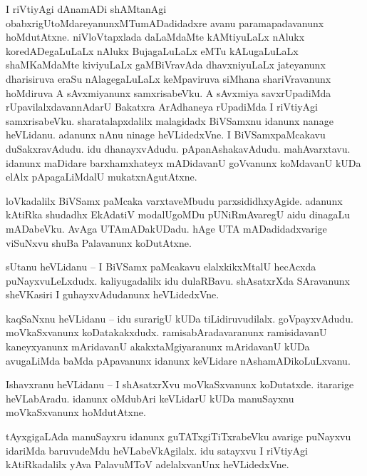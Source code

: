 \documentclass{article}
\begin{document}
\begin{mn}%
I riVtiyAgi dAnamADi shAMtanAgi obabxrigUtoMdareyanunxMTumADadidadxre avanu paramapadavanunx 
hoMdutAtxne. niVloVtapxlada daLaMdaMte kAMtiyuLaLx nAlukx koredADegaLuLaLx nAlukx BujagaLuLaLx 
eMTu kALugaLuLaLx shaMKaMdaMte kiviyuLaLx gaMBiVravAda dhavxniyuLaLx jateyanunx dharisiruva eraSu 
nAlagegaLuLaLx keMpaviruva siMhana shariVravanunx hoMdiruva A sAvxmiyanunx samxrisabeVku. A 
sAvxmiya savxrUpadiMda rUpavilalxdavannAdarU Bakatxra ArAdhaneya rUpadiMda I riVtiyAgi 
samxrisabeVku. sharatalapxdalilx malagidadx BiVSamxnu idanunx nanage heVLidanu. adanunx nAnu 
ninage heVLidedxVne. I BiVSamxpaMcakavu duSakxravAdudu. idu dhanayxvAdudu. pApanAshakavAdudu. 
mahAvarxtavu. idanunx maDidare barxhamxhateyx mADidavanU goVvanunx koMdavanU kUDa elAlx 
pApagaLiMdalU mukatxnAgutAtxne.
\end{mn}

\begin{mn}%
loVkadalilx BiVSamx paMcaka varxtaveMbudu parxsididhxyAgide. adanunx kAtiRka shudadhx EkAdatiV 
modalUgoMDu pUNiRmAvaregU aidu dinagaLu mADabeVku. AvAga UTAmADakUDadu. hAge UTA mADadidadxvarige 
viSuNxvu shuBa Palavanunx koDutAtxne.
\end{mn}

\begin{mn}%
sUtanu heVLidanu -- I BiVSamx paMcakavu elalxkikxMtalU hecAcxda puNayxvuLeLxdudx. kaliyugadalilx 
idu dulaRBavu. shAsatxrXda SAravanunx sheVKasiri I guhayxvAdudanunx heVLidedxVne.
\end{mn}

\begin{mn}%
kaqSaNxnu heVLidanu -- idu surarigU kUDa tiLidiruvudilalx. goVpayxvAdudu. moVkaSxvanunx 
koDatakakxdudx. ramisabAradavaranunx ramisidavanU kaneyxyanunx mAridavanU akakxtaMgiyaranunx 
mAridavanU kUDa avugaLiMda baMda pApavanunx idanunx keVLidare nAshamADikoLuLxvanu.
\end{mn}

\begin{mn}%
Ishavxranu heVLidanu -- I shAsatxrXvu moVkaSxvanunx koDutatxde. itararige heVLabAradu. idanunx 
oMdubAri keVLidarU kUDa manuSayxnu moVkaSxvanunx hoMdutAtxne.
\end{mn}

\begin{mn}%
tAyxgigaLAda manuSayxru idanunx guTATxgiTiTxrabeVku avarige puNayxvu idariMda baruvudeMdu 
heVLabeVkAgilalx. idu satayxvu I riVtiyAgi kAtiRkadalilx yAva PalavuMToV adelalxvanUnx 
heVLidedxVne.
\end{mn}
\end{document}
